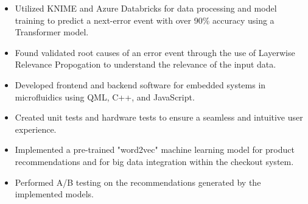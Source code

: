 \documentclass[10pt,a4paper,ragged2e]{altacv}
\begin{document}

\begin{fullwidth}\makecvheader
\end{fullwidth}



\begin{itemize}
    \item Utilized KNIME and Azure Databricks for data processing and model training to predict a next-error event with over 90\% accuracy using a Transformer model.
    \item Found validated root causes of an error event through the use of Layerwise Relevance Propogation to understand the relevance of the input data.
\end{itemize}

\divider

\begin{itemize}
    \item Developed frontend and backend software for embedded systems in microfluidics using QML, C++, and JavaScript.
    \item Created unit tests and hardware tests to ensure a seamless and intuitive user experience.
\end{itemize}

\divider

\begin{itemize}
\item Implemented a pre-trained "word2vec" machine learning model for product recommendations and for big data integration within the checkout system.
\item Performed A/B testing on the recommendations generated by the implemented models.
\end{itemize}
\end{document}
